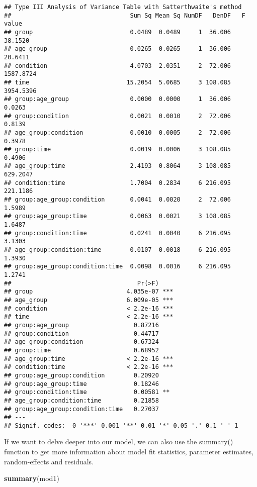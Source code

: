 \documentclass[]{article}
\newenvironment{Shaded}{\begin{snugshade}}{\end{snugshade}}
\newcommand{\KeywordTok}[1]{\textcolor[rgb]{0.13,0.29,0.53}{\textbf{#1}}}
\newcommand{\NormalTok}[1]{#1}
\begin{document}
\begin{verbatim}
## Type III Analysis of Variance Table with Satterthwaite's method
##                                 Sum Sq Mean Sq NumDF   DenDF   F value
## group                           0.0489  0.0489     1  36.006   38.1520
## age_group                       0.0265  0.0265     1  36.006   20.6411
## condition                       4.0703  2.0351     2  72.006 1587.8724
## time                           15.2054  5.0685     3 108.085 3954.5396
## group:age_group                 0.0000  0.0000     1  36.006    0.0263
## group:condition                 0.0021  0.0010     2  72.006    0.8139
## age_group:condition             0.0010  0.0005     2  72.006    0.3978
## group:time                      0.0019  0.0006     3 108.085    0.4906
## age_group:time                  2.4193  0.8064     3 108.085  629.2047
## condition:time                  1.7004  0.2834     6 216.095  221.1186
## group:age_group:condition       0.0041  0.0020     2  72.006    1.5989
## group:age_group:time            0.0063  0.0021     3 108.085    1.6487
## group:condition:time            0.0241  0.0040     6 216.095    3.1303
## age_group:condition:time        0.0107  0.0018     6 216.095    1.3930
## group:age_group:condition:time  0.0098  0.0016     6 216.095    1.2741
##                                   Pr(>F)    
## group                          4.035e-07 ***
## age_group                      6.009e-05 ***
## condition                      < 2.2e-16 ***
## time                           < 2.2e-16 ***
## group:age_group                  0.87216    
## group:condition                  0.44717    
## age_group:condition              0.67324    
## group:time                       0.68952    
## age_group:time                 < 2.2e-16 ***
## condition:time                 < 2.2e-16 ***
## group:age_group:condition        0.20920    
## group:age_group:time             0.18246    
## group:condition:time             0.00581 ** 
## age_group:condition:time         0.21858    
## group:age_group:condition:time   0.27037    
## ---
## Signif. codes:  0 '***' 0.001 '**' 0.01 '*' 0.05 '.' 0.1 ' ' 1
\end{verbatim}

If we want to delve deeper into our model, we can also use the summary()
function to get more information about model fit statistics, parameter
estimates, random-effects and residuals.

\begin{Shaded}
\begin{Highlighting}[]
\KeywordTok{summary}\NormalTok{(mod1)}
\end{Highlighting}
\end{Shaded}
\end{document}
